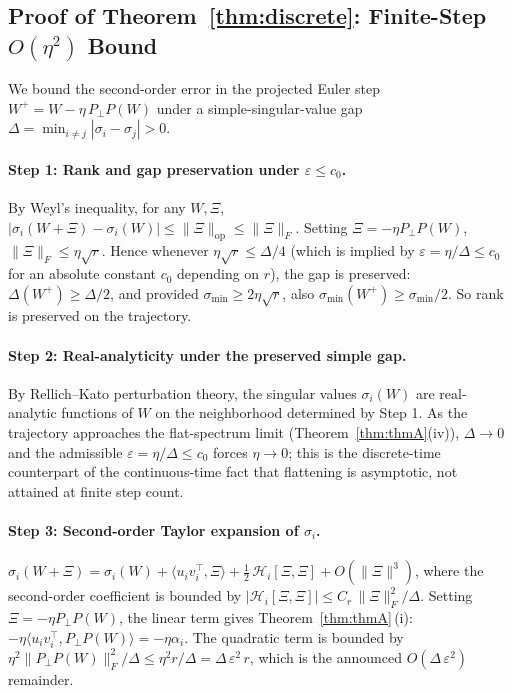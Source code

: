 \documentclass{article}
\begin{document}
\subsection{Proof of Theorem~\ref{thm:discrete}: Finite-Step $O(\eta^2)$ Bound}
\label{app:proof_discrete}

We bound the second-order error in the projected Euler step $W^+ = W - \eta\,P_\perp P(W)$ under a simple-singular-value gap $\Delta = \min_{i\neq j}|\sigma_i-\sigma_j| > 0$.

\paragraph{Step 1: Rank and gap preservation under $\varepsilon\leq c_0$.}
By Weyl's inequality, for any $W,\Xi$, $|\sigma_i(W+\Xi)-\sigma_i(W)|\leq\|\Xi\|_{\mathrm{op}}\leq\|\Xi\|_F$. Setting $\Xi=-\eta P_\perp P(W)$, $\|\Xi\|_F\leq\eta\sqrt r$. Hence whenever $\eta\sqrt r\leq\Delta/4$ (which is implied by $\varepsilon=\eta/\Delta\leq c_0$ for an absolute constant $c_0$ depending on $r$), the gap is preserved: $\Delta(W^+)\geq\Delta/2$, and provided $\sigma_{\min}\geq 2\eta\sqrt r$, also $\sigma_{\min}(W^+)\geq\sigma_{\min}/2$. So rank is preserved on the trajectory.

\paragraph{Step 2: Real-analyticity under the preserved simple gap.}
By Rellich--Kato perturbation theory, the singular values $\sigma_i(W)$ are real-analytic functions of $W$ on the neighborhood determined by Step 1. As the trajectory approaches the flat-spectrum limit (Theorem~\ref{thm:thmA}(iv)), $\Delta\to 0$ and the admissible $\varepsilon=\eta/\Delta\leq c_0$ forces $\eta\to 0$; this is the discrete-time counterpart of the continuous-time fact that flattening is asymptotic, not attained at finite step count.

\paragraph{Step 3: Second-order Taylor expansion of $\sigma_i$.}
$\sigma_i(W+\Xi) = \sigma_i(W) + \langle u_i v_i^\top,\Xi\rangle + \tfrac12\,\mathcal H_i[\Xi,\Xi] + O(\|\Xi\|^3)$, where the second-order coefficient is bounded \citep[Thm.~3.1]{stewart1990matrix} by $|\mathcal H_i[\Xi,\Xi]| \leq C_r\,\|\Xi\|_F^2/\Delta$. Setting $\Xi = -\eta P_\perp P(W)$, the linear term gives Theorem~\ref{thm:thmA}\,(i): $-\eta\langle u_i v_i^\top, P_\perp P(W)\rangle = -\eta\alpha_i$. The quadratic term is bounded by $\eta^2\|P_\perp P(W)\|_F^2/\Delta\leq \eta^2 r/\Delta = \Delta\,\varepsilon^2\,r$, which is the announced $O(\Delta\,\varepsilon^2)$ remainder.
\end{document}
